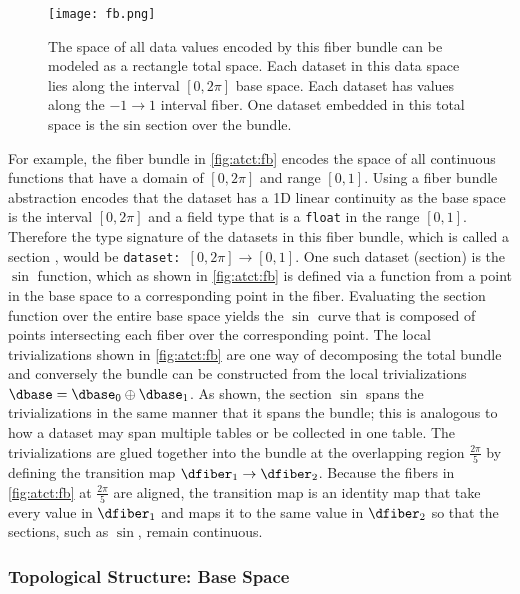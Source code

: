 \documentclass[journal]{IEEEtran}
\theoremstyle{definition}
\theoremstyle{remark}
\begin{document}
\begin{figure}[!h]
       \texttt{[image: fb.png]}
       \caption{The space of all data values encoded by this fiber bundle can be modeled as a \textcolor{total}{rectangle} total space. Each dataset in this data space lies along the interval \textcolor{base}{$[0,2\pi]$} base space. Each dataset has values along the \textcolor{fiber}{$-1 \rightarrow 1$} interval fiber. One dataset embedded in this total space is the \textcolor{section}{sin} section over the bundle.}\label{fig:atct:fb}
  \end{figure}


For example, the fiber bundle in \autoref{fig:atct:fb} encodes the space of all continuous functions that have a domain of $[0, 2\pi]$ and range $[0,1]$. Using a fiber bundle abstraction encodes that the dataset has a 1D linear continuity as the base space \dbase is the interval $[0,2\pi]$ and a field type that is a \texttt{float} in the range $[0,1]$. Therefore the type signature of the datasets in this fiber bundle, which is called a section \dsection, would be \texttt{dataset: $[0, 2\pi] \rightarrow [0,1]$}. One such dataset (section) is the $\sin$ function, which as shown in \autoref{fig:atct:fb} is defined via a function \dsection from a point in the base space to a corresponding point in the fiber. Evaluating the section function over the entire base space yields the $\sin$ curve that is composed of points intersecting each fiber over the corresponding point. The local trivializations shown in \autoref{fig:atct:fb} are one way of decomposing the total bundle and conversely the bundle can be constructed from the local trivializations $\dbase = \dbase_{0} \oplus \dbase_{1}$. As shown, the section $\sin$ spans the trivializations in the same manner that it spans the bundle; this is analogous to how a dataset may span multiple tables or be collected in one table. The trivializations are glued together into the bundle at the overlapping region $\frac{2\pi}{5}$ by defining the transition map $\dfiber_{1} \rightarrow \dfiber_{2}$. Because the fibers in \autoref{fig:atct:fb} at $\frac{2\pi}{5}$ are aligned, the transition map is an identity map that take every value in $\dfiber_1$ and maps it to the same value in $\dfiber_2$ so that the sections, such as $\sin$, remain continuous.


\subsubsection{\textcolor{base}{Topological Structure: Base Space \dbase}}
\label{sec:atct:fb:base}
\end{document}
